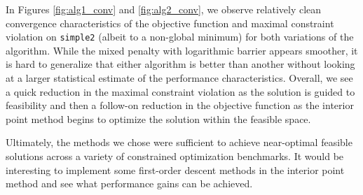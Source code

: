 \documentclass[conference]{IEEEtran}
\begin{document}
In Figures \ref{fig:alg1_conv} and \ref{fig:alg2_conv}, we observe relatively clean convergence characteristics of the objective function and maximal constraint violation on \texttt{simple2} (albeit to a non-global minimum) for both variations of the algorithm. While the mixed penalty with logarithmic barrier appears smoother, it is hard to generalize that either algorithm is better than another without looking at a larger statistical estimate of the performance characteristics. Overall, we see a quick reduction in the maximal constraint violation as the solution is guided to feasibility and then a follow-on reduction in the objective function as the interior point method begins to optimize the solution within the feasible space.

Ultimately, the methods we chose were sufficient to achieve near-optimal feasible solutions across a variety of constrained optimization benchmarks. It would be interesting to implement some first-order descent methods in the interior point method and see what performance gains can be achieved.
\end{document}
